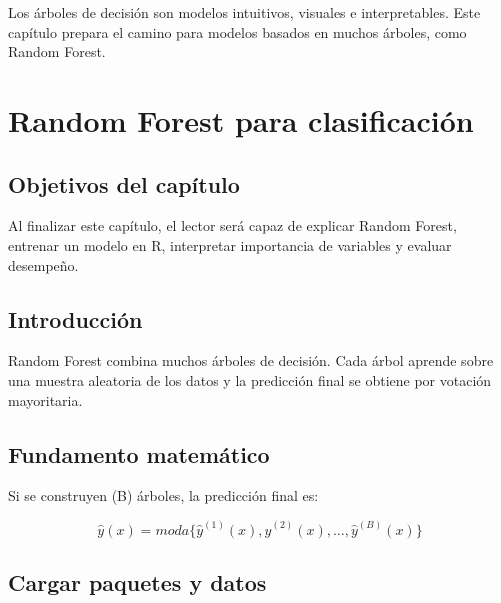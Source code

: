 \documentclass[
  spanish,
  11pt,
  letterpaper,
]{book}
\begin{document}
Los árboles de decisión son modelos intuitivos, visuales e
interpretables. Este capítulo prepara el camino para modelos basados en
muchos árboles, como Random Forest.


\chapter{Random Forest para
clasificación}\label{random-forest-para-clasificaciuxf3n}

\section{Objetivos del capítulo}\label{objetivos-del-capuxedtulo-6}

Al finalizar este capítulo, el lector será capaz de explicar Random
Forest, entrenar un modelo en R, interpretar importancia de variables y
evaluar desempeño.

\section{Introducción}\label{introducciuxf3n-3}

Random Forest combina muchos árboles de decisión. Cada árbol aprende
sobre una muestra aleatoria de los datos y la predicción final se
obtiene por votación mayoritaria.

\section{Fundamento matemático}\label{fundamento-matemuxe1tico-2}

Si se construyen (B) árboles, la predicción final es:

\[
\hat{y}(x) = moda\{\hat{y}^{(1)}(x), \hat{y}^{(2)}(x), \ldots, \hat{y}^{(B)}(x)\}
\]

\section{Cargar paquetes y datos}\label{cargar-paquetes-y-datos-2}
\end{document}
